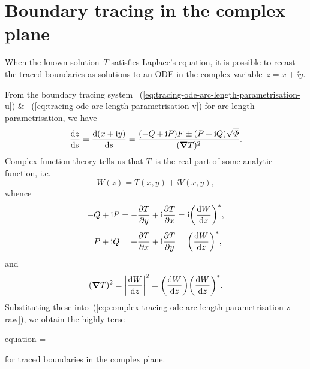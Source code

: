 \chapter{Boundary tracing in the complex plane}
\label{ch:complex}

When the known solution~$T$ satisfies Laplace's equation,
it is possible to recast the traced boundaries
as solutions to an ODE in the complex variable~$z = x + \ii y$.

From the boundary tracing system~%
  (\ref{eq:tracing-ode-arc-length-parametrisation-u})
\&~%
  (\ref{eq:tracing-ode-arc-length-parametrisation-v})
for arc-length parametrisation,
we have
\begin{equation}
  \tder{z}{s}
    = \tder{(x + \ii y)}{s}
    = \frac{(-Q + \ii P) F \pm (P + \ii Q) \sqrt{\Phi}}{(\del T)^2}.
  \label{eq:complex-tracing-ode-arc-length-parametrisation-z-raw}
\end{equation}
Complex function theory tells us that
$T$~is the real part of some analytic function,
i.e.
\begin{equation}
  W (z) = T (x, y) + \ii V (x, y),
  \label{eq:complex-analytic-function-components}
\end{equation}
whence
\begin{align}
  -Q + \ii P
    &= -\pder{T}{y} + \ii \pder{T}{x}
    = \ii \conj{\roundbr*{\tder{W}{z}}},
      \label{eq:complex-tracing-ode-flux-factor}
      \\[\tallspace]
  P + \ii Q
    &= +\pder{T}{x} + \ii \pder{T}{y}
    = \conj{\roundbr*{\tder{W}{z}}},
      \label{eq:complex-tracing-ode-viability-factor}
\end{align}
and
\begin{equation}
  (\del T)^2
    = \abs*{\tder{W}{z}}^2
    = \roundbr*{\tder{W}{z}} \conj{\roundbr*{\tder{W}{z}}}.
  \label{eq:complex-tracing-gradient-squared}
\end{equation}
Substituting these
into~(\ref{eq:complex-tracing-ode-arc-length-parametrisation-z-raw}),
we obtain the highly terse
\begin{important}{equation}
   = 
  \label{eq:complex-tracing-ode-arc-length-parametrisation-z}
\end{important}
for traced boundaries in the complex plane.


